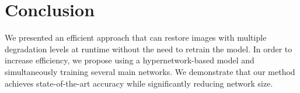 \documentclass{article}
\begin{document}
 \section{Conclusion}
We presented an efficient approach that can restore images with multiple degradation levels at runtime without the need to retrain the model. In order to increase efficiency, we propose using a hypernetwork-based model and simultaneously training several main networks. We demonstrate that our method achieves state-of-the-art accuracy while significantly reducing network size.

\vfill\pagebreak








\end{document}
